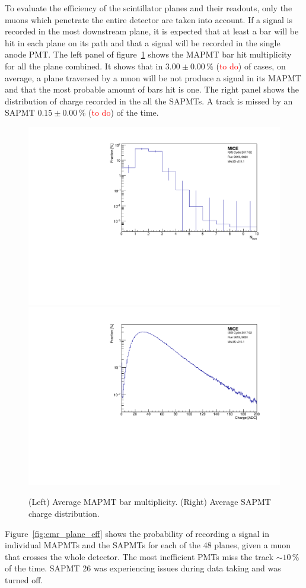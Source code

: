 To evaluate the efficiency of the scintillator planes and their readouts, only the muons which penetrate the entire detector are taken into account. If a signal is recorded in the most downstream plane, it is expected that at least a bar will be hit in each plane on its path and that a signal will be recorded in the single anode PMT. The left panel of figure~\ref{fig:emr_eff} shows the MAPMT bar hit multiplicity for all the plane combined. It shows that in $3.00\pm0.00\,\%$ (\textcolor{red}{to do}) of cases, on average, a plane traversed by a muon will be not produce a signal in its MAPMT and that the most probable amount of bars hit is one. The right panel shows the distribution of charge recorded in the all the SAPMTs. A track is missed by an SAPMT $0.15\pm0.00\,\%$ (\textcolor{red}{to do}) of the time.

\begin{figure}
	\begin{center}
		\includegraphics[width=0.49\columnwidth]{nbars.pdf}
		\hfill
		\includegraphics[width=0.49\columnwidth]{charge.pdf}
		\caption{(Left) Average MAPMT bar multiplicity. (Right) Average SAPMT charge distribution.}
		\label{fig:emr_eff}
	\end{center}
\end{figure}

Figure~\ref{fig:emr_plane_eff} shows the probability of recording a signal in individual MAPMTs and the SAPMTs for each of the 48 planes, given a muon that crosses the whole detector. The most inefficient PMTs miss the track $\sim10\,\%$ of the time. SAPMT 26 was experiencing issues during data taking and was turned off.

